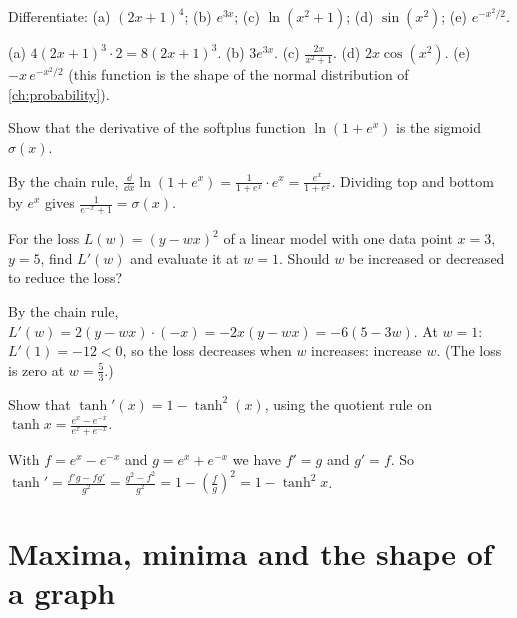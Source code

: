 \begin{exercise}
Differentiate: (a) $(2x + 1)^4$; (b) $e^{3x}$; (c) $\ln(x^2 + 1)$;
(d) $\sin(x^2)$; (e) $e^{-x^2/2}$.
\end{exercise}
\begin{solution}
(a) $4(2x + 1)^3\cdot2 = 8(2x + 1)^3$. (b) $3e^{3x}$. (c) $\tfrac{2x}{x^2 + 1}$.
(d) $2x\cos(x^2)$. (e) $-x\,e^{-x^2/2}$ (this function is the shape of the
normal distribution of \cref{ch:probability}).
\end{solution}

\begin{exercise}
Show that the derivative of the softplus function $\ln(1 + e^x)$ is the
sigmoid $\sigma(x)$.
\end{exercise}
\begin{solution}
By the chain rule, $\tfrac{\dd}{\dd x}\ln(1 + e^x) = \tfrac{1}{1 + e^x}\cdot e^x =
\tfrac{e^x}{1 + e^x}$. Dividing top and bottom by $e^x$ gives
$\tfrac{1}{e^{-x} + 1} = \sigma(x)$.
\end{solution}

\begin{exercise}
For the loss $L(w) = (y - wx)^2$ of a linear model with one data point
$x = 3$, $y = 5$, find $L'(w)$ and evaluate it at $w = 1$. Should $w$ be
increased or decreased to reduce the loss?
\end{exercise}
\begin{solution}
By the chain rule, $L'(w) = 2(y - wx)\cdot(-x) = -2x(y - wx) = -6(5 - 3w)$. At
$w = 1$: $L'(1) = -12 < 0$, so the loss decreases when $w$ increases: increase
$w$. (The loss is zero at $w = \tfrac53$.)
\end{solution}

\begin{exercise}
Show that $\tanh'(x) = 1 - \tanh^2(x)$, using the quotient rule on
$\tanh x = \frac{e^x - e^{-x}}{e^x + e^{-x}}$.
\end{exercise}
\begin{solution}
With $f = e^x - e^{-x}$ and $g = e^x + e^{-x}$ we have $f' = g$ and $g' = f$.
So $\tanh' = \tfrac{f'g - fg'}{g^2} = \tfrac{g^2 - f^2}{g^2} = 1 -
\left(\tfrac fg\right)^2 = 1 - \tanh^2 x$.
\end{solution}

\section{Maxima, minima and the shape of a graph}\label{sec:extrema}

